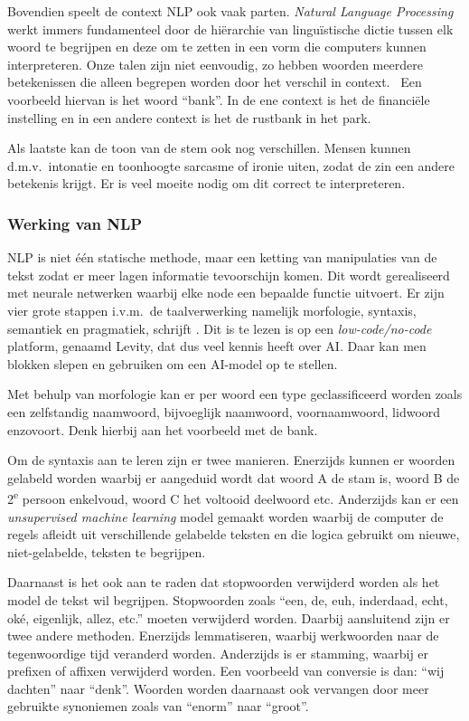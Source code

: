 Bovendien speelt de context NLP ook vaak parten. \textit{Natural Language Processing} werkt immers fundamenteel door de hiërarchie van linguïstische dictie tussen elk woord te begrijpen en deze om te zetten in een vorm die computers kunnen interpreteren. Onze talen zijn niet eenvoudig, zo hebben woorden meerdere betekenissen die alleen begrepen worden door het verschil in context.~\autocite{Kleinings2022} Een voorbeeld hiervan is het woord ``bank''. In de ene context is het de financiële instelling en in een andere context is het de rustbank in het park.

Als laatste kan de toon van de stem ook nog verschillen. Mensen kunnen d.m.v.\ intonatie en toonhoogte sarcasme of ironie uiten, zodat de zin een andere betekenis krijgt. Er is veel moeite nodig om dit correct te interpreteren.

\subsubsection{Werking van NLP}
NLP is niet één statische methode, maar een ketting van manipulaties van de tekst zodat er meer lagen informatie tevoorschijn komen. Dit wordt gerealiseerd met neurale netwerken waarbij elke node een bepaalde functie uitvoert.
Er zijn vier grote stappen i.v.m.\ de taalverwerking namelijk morfologie, syntaxis, semantiek en pragmatiek, schrijft \textcite{Kleinings2022}. Dit is te lezen is op een \textit{low-code/no-code} platform, genaamd Levity, dat dus veel kennis heeft over AI. Daar kan men blokken slepen en gebruiken om een AI-model op te stellen.

Met behulp van morfologie kan er per woord een type geclassificeerd worden zoals een zelfstandig naamwoord, bijvoeglijk naamwoord, voornaamwoord, lidwoord enzovoort. Denk hierbij aan het voorbeeld met de bank.

Om de syntaxis aan te leren zijn er twee manieren. Enerzijds kunnen er woorden gelabeld worden waarbij er aangeduid wordt dat woord A de stam is, woord B de 2\textsuperscript{e} persoon enkelvoud, woord C het voltooid deelwoord etc. Anderzijds kan er een \textit{unsupervised machine learning} model gemaakt worden waarbij de computer de regels afleidt uit verschillende gelabelde teksten en die logica gebruikt om nieuwe, niet-gelabelde, teksten te begrijpen.

Daarnaast is het ook aan te raden dat stopwoorden verwijderd worden als het model de tekst wil begrijpen. Stopwoorden zoals ``een, de, euh, inderdaad, echt, oké, eigenlijk, allez, etc.'' moeten verwijderd worden. Daarbij aansluitend zijn er twee andere methoden. Enerzijds lemmatiseren, waarbij  werkwoorden naar de tegenwoordige tijd veranderd worden.
Anderzijds is er stamming, waarbij er prefixen of affixen verwijderd worden. Een voorbeeld van conversie is dan: ``wij dachten'' naar ``denk''. Woorden worden daarnaast ook vervangen door meer gebruikte synoniemen zoals van ``enorm'' naar ``groot''.

